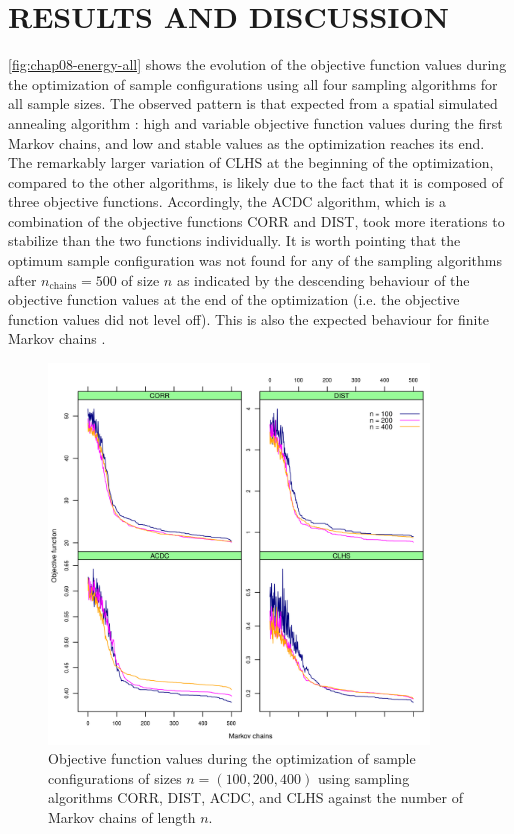 \section{RESULTS AND DISCUSSION}

\autoref{fig:chap08-energy-all} shows the evolution of the objective function values during the optimization of 
sample configurations using all four sampling algorithms for all sample sizes. The observed pattern is that 
expected from a spatial simulated annealing algorithm \cite{LarkEtAl2003}: high and variable objective function 
values during the first Markov chains, and low and stable values as the optimization reaches its end. The 
remarkably larger variation of CLHS at the beginning of the optimization, compared to the other algorithms, is 
likely due to the fact that it is composed of three objective functions. Accordingly, the ACDC algorithm, which 
is a combination of the objective functions CORR and DIST, took more iterations to stabilize than the two 
functions individually. It is worth pointing that the optimum sample configuration was not found for any of the 
sampling algorithms after $n_\text{chains} = 500$ of size $n$ as indicated by the descending behaviour of the 
objective function values at the end of the optimization (i.e. the objective function values did not level 
off). This is also the expected behaviour for finite Markov chains \cite{WebsterEtAl2013}.

\begin{figure}[!ht]
 \centering
 \includegraphics[width=0.90\textwidth]{fig/chap08-energy-corr-dist-acdc-clhs}
\caption[Objective function values during the optimization of three sample configurations using four sampling 
algorithms.]{Objective function values during the optimization of sample configurations of sizes $n = (100, 
200, 400)$ using sampling algorithms CORR, DIST, ACDC, and CLHS against the number of Markov chains of length 
$n$.}
\label{fig:chap08-energy-all}
\end{figure}


